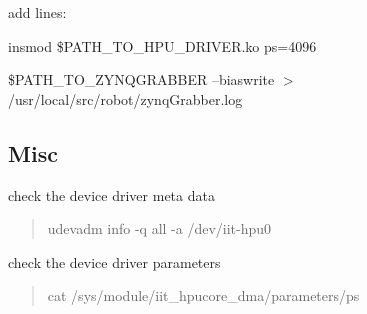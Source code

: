 add lines\+:


\begin{DoxyItemize}
\item insmod \$\+P\+A\+T\+H\+\_\+\+T\+O\+\_\+\+H\+P\+U\+\_\+\+D\+R\+I\+V\+E\+R.\+ko ps=4096
\item \$\+P\+A\+T\+H\+\_\+\+T\+O\+\_\+\+Z\+Y\+N\+Q\+G\+R\+A\+B\+B\+ER --biaswrite $>$ /usr/local/src/robot/zynq\+Grabber.log
\end{DoxyItemize}

\subsection*{Misc}

check the device driver meta data

\begin{quote}
udevadm info -\/q all -\/a /dev/iit-\/hpu0 \end{quote}


check the device driver parameters

\begin{quote}
cat /sys/module/iit\+\_\+hpucore\+\_\+dma/parameters/ps\end{quote}
